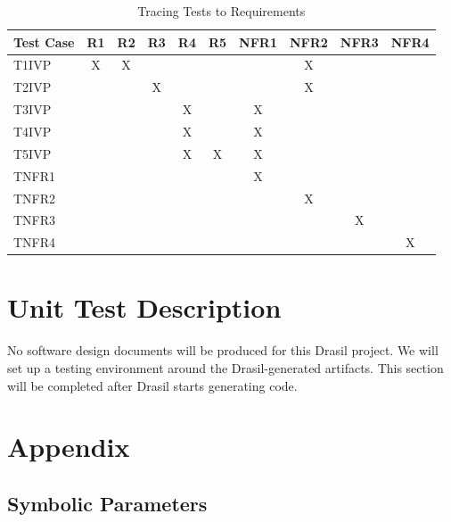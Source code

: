 \documentclass[12pt, titlepage]{article}
\begin{document}
\begin{table}[h!]
\centering
\renewcommand{\arraystretch}{1.2}
\begin{tabular}{lccccccccc}
\toprule
\textbf{Test Case} & \textbf{R1} & \textbf{R2} & \textbf{R3} & \textbf{R4} &
\textbf{R5} & \textbf{NFR1} & \textbf{NFR2} & \textbf{NFR3} & \textbf{NFR4} \\
\midrule
T1IVP  & X & X &   &   &   &   & X &   &   \\
T2IVP  &   &   & X &   &   &   & X &   &   \\
T3IVP  &   &   &   & X &   & X &   &   &   \\
T4IVP  &   &   &   & X &   & X &   &   &   \\
T5IVP  &   &   &   & X & X & X &   &   &   \\
TNFR1  &   &   &   &   &   & X &   &   &   \\
TNFR2  &   &   &   &   &   &   & X &   &   \\
TNFR3  &   &   &   &   &   &   &   & X &   \\
TNFR4  &   &   &   &   &   &   &   &   & X \\
\bottomrule
\end{tabular}
\caption{Tracing Tests to Requirements}
\label{tab:test-req-trace}
\end{table}

\newpage

\section{Unit Test Description}

No software design documents will be produced for this Drasil project. We will
set up a testing environment around the Drasil-generated artifacts. This
section will be completed after Drasil starts generating code.

\newpage




\newpage

\section{Appendix}

\subsection{Symbolic Parameters}
\end{document}
